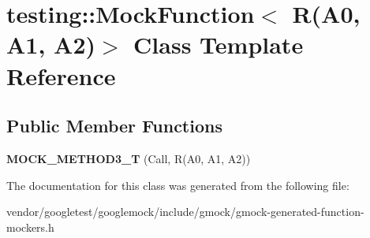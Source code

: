 \hypertarget{classtesting_1_1MockFunction_3_01R_07A0_00_01A1_00_01A2_08_4}{}\section{testing\+:\+:Mock\+Function$<$ R(A0, A1, A2)$>$ Class Template Reference}
\label{classtesting_1_1MockFunction_3_01R_07A0_00_01A1_00_01A2_08_4}
\subsection*{Public Member Functions}
\begin{DoxyCompactItemize}
\item 
{\bfseries M\+O\+C\+K\+\_\+\+M\+E\+T\+H\+O\+D3\+\_\+T} (Call, R(A0, A1, A2))\hypertarget{classtesting_1_1MockFunction_3_01R_07A0_00_01A1_00_01A2_08_4_afcc79eab94b7d873f71ccf7b08ce582f}{}\label{classtesting_1_1MockFunction_3_01R_07A0_00_01A1_00_01A2_08_4_afcc79eab94b7d873f71ccf7b08ce582f}

\end{DoxyCompactItemize}


The documentation for this class was generated from the following file\+:\begin{DoxyCompactItemize}
\item 
vendor/googletest/googlemock/include/gmock/gmock-\/generated-\/function-\/mockers.\+h\end{DoxyCompactItemize}
